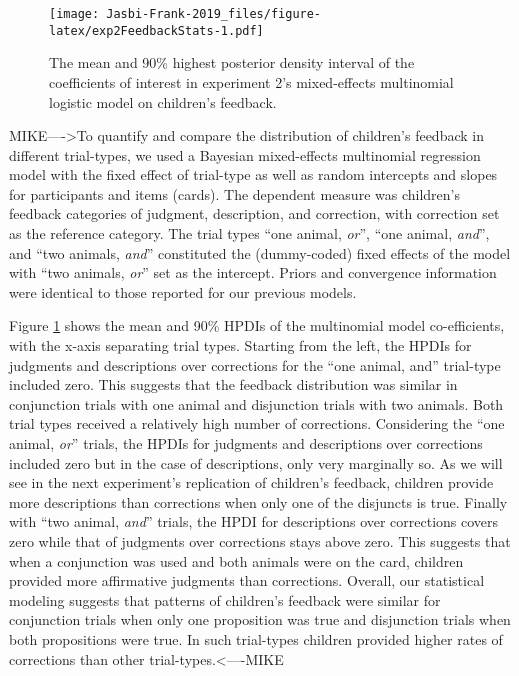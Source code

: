 \documentclass[,man,floatsintext]{apa6}
\begin{document}
\begin{figure}
\centering
\texttt{[image: Jasbi-Frank-2019\_files/figure-latex/exp2FeedbackStats-1.pdf]}
\caption{\label{fig:exp2FeedbackStats}The mean and 90\% highest posterior density interval of the coefficients of interest in experiment 2's mixed-effects multinomial logistic model on children's feedback.}
\end{figure}

MIKE----\textgreater{}To quantify and compare the distribution of children's feedback in different trial-types, we used a Bayesian mixed-effects multinomial regression model with the fixed effect of trial-type as well as random intercepts and slopes for participants and items (cards). The dependent measure was children's feedback categories of judgment, description, and correction, with correction set as the reference category. The trial types \enquote{one animal, \emph{or}}, \enquote{one animal, \emph{and}}, and \enquote{two animals, \emph{and}} constituted the (dummy-coded) fixed effects of the model with \enquote{two animals, \emph{or}} set as the intercept. Priors and convergence information were identical to those reported for our previous models.

Figure \ref{fig:exp2FeedbackStats} shows the mean and 90\% HPDIs of the multinomial model co-efficients, with the x-axis separating trial types. Starting from the left, the HPDIs for judgments and descriptions over corrections for the \enquote{one animal, and} trial-type included zero. This suggests that the feedback distribution was similar in conjunction trials with one animal and disjunction trials with two animals. Both trial types received a relatively high number of corrections. Considering the \enquote{one animal, \emph{or}} trials, the HPDIs for judgments and descriptions over corrections included zero but in the case of descriptions, only very marginally so. As we will see in the next experiment's replication of children's feedback, children provide more descriptions than corrections when only one of the disjuncts is true. Finally with \enquote{two animal, \emph{and}} trials, the HPDI for descriptions over corrections covers zero while that of judgments over corrections stays above zero. This suggests that when a conjunction was used and both animals were on the card, children provided more affirmative judgments than corrections. Overall, our statistical modeling suggests that patterns of children's feedback were similar for conjunction trials when only one proposition was true and disjunction trials when both propositions were true. In such trial-types children provided higher rates of corrections than other trial-types.\textless{}----MIKE
\end{document}
